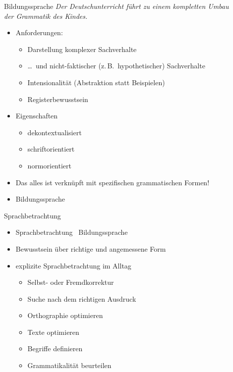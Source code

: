 \begin{frame}
  {Bildungssprache}
  \onslide<+->
  \onslide<+->
  \alert{\textit{Der Deutschunterricht führt zu einem kompletten Umbau\\
  der Grammatik des Kindes.}} \\
  \Zeile
  \begin{itemize}[<+->]
    \item Anforderungen:
    \begin{itemize}[<+->]
      \item Darstellung komplexer Sachverhalte
      \item \dots\ und nicht-faktischer (z.\,B.\ hypothetischer) Sachverhalte
      \item Intensionalität (Abstraktion statt Beispielen)
      \item Registerbewusstsein
    \end{itemize}
       \Halbzeile 
      \item Eigenschaften
    \begin{itemize}[<+->]
      \item dekontextualisiert
      \item schriftorientiert
      \item normorientiert
    \end{itemize}
        \Halbzeile
      \item \alert{Das alles ist verknüpft mit spezifischen grammatischen Formen!}
      \item[\ding{222}] \alert{Bildungssprache}
  \end{itemize}
\end{frame}

\begin{frame}
  {Sprachbetrachtung}
  \onslide<+->
  \begin{itemize}[<+->]
    \item \alert{Sprachbetrachtung \ Bildungssprache}
     \Zeile 
    \item Bewusstsein über richtige und angemessene Form
     \Zeile 
    \item explizite Sprachbetrachtung im Alltag
      \Halbzeile
      \begin{itemize}[<+->]
        \item Selbst- oder Fremdkorrektur
        \item Suche nach dem richtigen Ausdruck
        \item Orthographie optimieren
        \item Texte optimieren
        \item Begriffe definieren
        \item Grammatikalität beurteilen
      \end{itemize}
  \end{itemize}
\end{frame}

